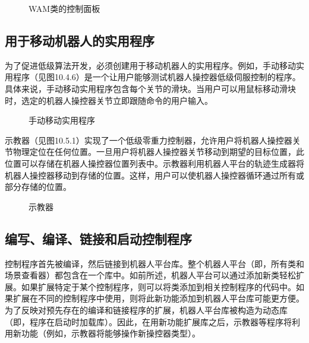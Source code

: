 \documentclass[UTF8,a4paper,12pt]{ctexart}
\begin{document}
\begin{figure}[htbp]
\centering
{}
\caption{WAM类的控制面板}
\label{fig:10.4.5}
\end{figure}

\subsection{用于移动机器人的实用程序}

为了促进低级算法开发，必须创建用于移动机器人的实用程序。例如，手动移动实用程序（见图10.4.6）是一个让用户能够测试机器人操控器低级伺服控制的程序。具体来说，手动移动实用程序包含每个关节的滑块。当用户可以用鼠标移动滑块时，选定的机器人操控器关节立即跟随命令的用户输入。

\begin{figure}[htbp]
\centering
{}
\caption{手动移动实用程序}
\label{fig:10.4.6}
\end{figure}

示教器（见图10.5.1）实现了一个低级零重力控制器，允许用户将机器人操控器关节物理定位在任何位置。一旦用户将机器人操控器关节移动到期望的目标位置，此位置可以存储在机器人操控器位置列表中。示教器利用机器人平台的轨迹生成器将机器人操控器移动到存储的位置。这样，用户可以使机器人操控器循环通过所有或部分存储的位置。

\begin{figure}[htbp]
\centering
{}
\caption{示教器}
\label{fig:10.5.1}
\end{figure}

\subsection{编写、编译、链接和启动控制程序}

控制程序首先被编译，然后链接到机器人平台库。整个机器人平台（即，所有类和场景查看器）都包含在一个库中。如前所述，机器人平台可以通过添加新类轻松扩展。如果扩展特定于某个控制程序，则可以将类添加到相关控制程序的代码中。如果扩展在不同的控制程序中使用，则将此新功能添加到机器人平台库可能更方便。为了反映对预先存在的编译和链接程序的扩展，机器人平台库被构造为动态库（即，程序在启动时加载库）。因此，在用新功能扩展库之后，示教器等程序将利用新功能（例如，示教器将能够操作新操控器类型）。
\end{document}
